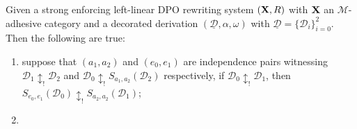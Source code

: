 \documentclass[a4paper,UKenglish,cleveref,pdftex, thm-restate,numberwithinsect,anonymous]{lipics}
\def\R{\mathsf{R}}
\def\X{\textbf {\textup{X}}}
\newcommand{\dder}[1]{\mathscr{#1}}
\newcommand{\der}[1]{\underline{\dder{#1}}}
\begin{document}
\iffalse
	\begin{corollary} Given a strong enforcing  left-linear DPO rewriting system  $(\X,\R)$ with $\X$ an $\mathcal{M}$-adhesive category and a decorated derivation $(\der{D}, \alpha, \omega)$ with $\der{D}=\{\dder{D}_i\}_{i=0}^2$. Then the following are true:
		\begin{enumerate}
			\item suppose that $(a_1,a_2)$ and $(e_0,e_1)$ are independence pairs witnessing  $\dder{D}_1\updownarrow_! \dder{D}_2$ and $\dder{D}_0\updownarrow_! S_{a_1,a_2}(\dder{D}_2)$ respectively, if $\dder{D}_0\updownarrow_!\dder{D}_1$, then $S_{e_0,e_1}(\dder{D}_0)\updownarrow_!S_{a_2,a_2}(\dder{D}_1)$;
			\item
		\end{enumerate}
	\end{corollary}
\end{document}
